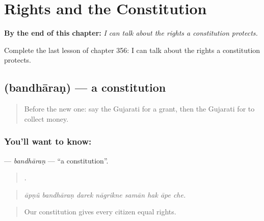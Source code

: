 
\chapter{Rights and the Constitution}
\label{ch:gu-rights-and-the-constitution}

\begin{chapteropening}
\textbf{By the end of this chapter:} \emph{I can talk about the rights a constitution protects.}

Complete the last lesson of chapter 356: I can talk about the rights a constitution protects.
\end{chapteropening}

\section[\texorpdfstring{\gu{બંધારણ} (bandhāraṇ)}{બંધારણ (bandhāraṇ)}]{ (bandhāraṇ) — a constitution}

\label{lesson:GU-C356-bandharan}



\begin{quote}
Before the new one: say the Gujarati for a grant, then the Gujarati for to collect money.
\end{quote}

\subsection*{You'll want to know: }
\textbf{} — \emph{bandhāraṇ} — \textquotedblleft{}a constitution\textquotedblright{}.

\begin{quote}
       .
\end{quote}

\begin{quote}
\emph{āpṇũ bandhāraṇ darek nāgrikne samān hak āpe che.}
\end{quote}

\begin{quote}
Our constitution gives every citizen equal rights.
\end{quote}

